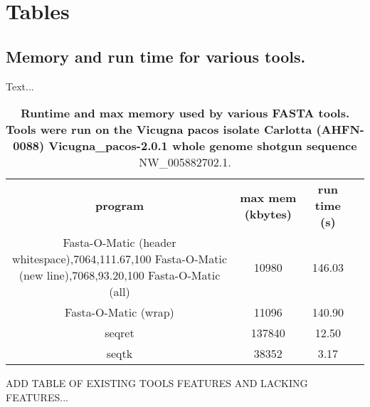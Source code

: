 \section*{Tables}
\subsection{Memory and run time for various tools.}

Text...  

\begin{table}
\begin{center}
\begin{tabular}{cccc}
\hline
 \textbf{program} & \textbf{max mem (kbytes)}  & \textbf{run time (s)}  \\ 
 Fasta-O-Matic (header whitespace),7064,111.67,100
Fasta-O-Matic (new line),7068,93.20,100				  
Fasta-O-Matic (all)          & 10980      & 146.03     \\   
Fasta-O-Matic (wrap)          & 11096      & 140.90     \\ 
seqret          & 137840      & 12.50     \\              
seqtk          & 38352      & 3.17      \\            
\hline
\end{tabular}
\end{center}
\caption{\textbf{Runtime and max memory used by various FASTA tools. Tools were run on the Vicugna pacos isolate Carlotta (AHFN-0088) Vicugna_pacos-2.0.1 whole genome shotgun sequence} NW_005882702.1.}
\end{table}

ADD TABLE OF EXISTING TOOLS FEATURES AND LACKING FEATURES...

  
  